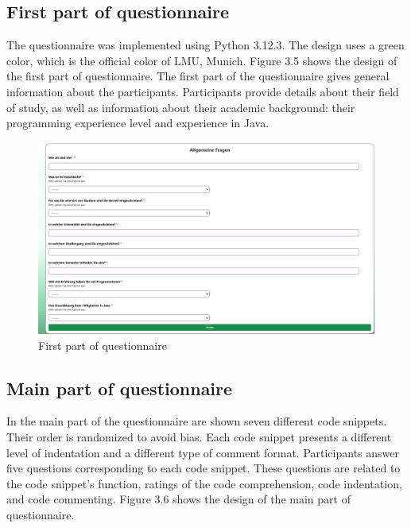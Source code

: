 \subsection{First part of questionnaire}



The questionnaire was implemented using Python 3.12.3. The design uses a green color, which is the official color of LMU, Munich. 
Figure 3.5 shows the design of the first part of questionnaire. The first part of the questionnaire gives general information about the participants. 
Participants provide details about their field of study, as well as information about their academic background: their programming experience level and experience in Java. 
\begin{figure} [H]
  \centering
  \includegraphics[scale=0.40]{figures/allgemein.png}
  \caption{First part of questionnaire}
  \label{fig:AnhangsChor}
\end{figure}


\subsection{Main part of questionnaire}

In the main part of the questionnaire are shown seven different code snippets. Their order is randomized to avoid bias. Each code snippet presents a different level of indentation and a different type of comment format.
Participants answer five questions corresponding to each code snippet. These questions are related to the code snippet’s function, ratings of the code comprehension, code indentation, and code commenting. Figure 3.6 shows the design of the main part of questionnaire.


